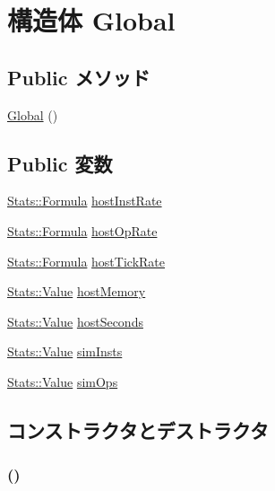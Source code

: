 \hypertarget{structStats_1_1Global}{
\section{構造体 Global}
\label{structStats_1_1Global}
}
\subsection*{Public メソッド}
\begin{DoxyCompactItemize}
\item 
\hyperlink{structStats_1_1Global_a476a3f406f55a264ed607815ad8a6d95}{Global} ()
\end{DoxyCompactItemize}
\subsection*{Public 変数}
\begin{DoxyCompactItemize}
\item 
\hyperlink{classStats_1_1Formula}{Stats::Formula} \hyperlink{structStats_1_1Global_a2b4d5dc5686142550e8bc71b3506ca6a}{hostInstRate}
\item 
\hyperlink{classStats_1_1Formula}{Stats::Formula} \hyperlink{structStats_1_1Global_ac43290f70c13d5f90def294ffb7d31fb}{hostOpRate}
\item 
\hyperlink{classStats_1_1Formula}{Stats::Formula} \hyperlink{structStats_1_1Global_ade31e6bd5249c4c177a243712087273d}{hostTickRate}
\item 
\hyperlink{classStats_1_1Value}{Stats::Value} \hyperlink{structStats_1_1Global_aae59e62e4e9351debbabc39403541384}{hostMemory}
\item 
\hyperlink{classStats_1_1Value}{Stats::Value} \hyperlink{structStats_1_1Global_aa0a6a2ab0ce3ca308a35804a82fafac8}{hostSeconds}
\item 
\hyperlink{classStats_1_1Value}{Stats::Value} \hyperlink{structStats_1_1Global_a4f0a0c52f94351c861630b23cb71be8b}{simInsts}
\item 
\hyperlink{classStats_1_1Value}{Stats::Value} \hyperlink{structStats_1_1Global_af015afd21d265f4e400aca0c73382472}{simOps}
\end{DoxyCompactItemize}


\subsection{コンストラクタとデストラクタ}
\hypertarget{structStats_1_1Global_a476a3f406f55a264ed607815ad8a6d95}{
\subsubsection[{Global}]{ ()}}
\label{structStats_1_1Global_a476a3f406f55a264ed607815ad8a6d95}



